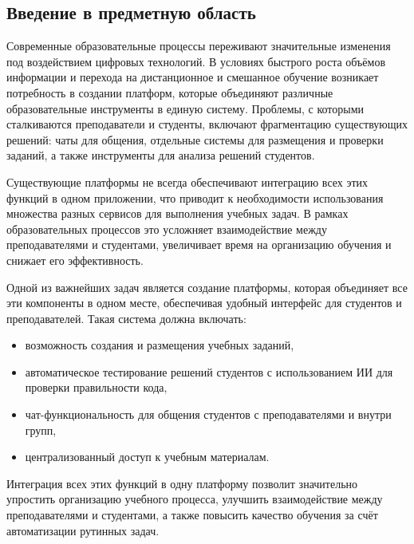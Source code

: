 \subsection{Введение в предметную область}

Современные образовательные процессы переживают значительные изменения под воздействием цифровых технологий. В условиях быстрого роста объёмов информации и перехода на дистанционное и смешанное обучение возникает потребность в создании платформ, которые объединяют различные образовательные инструменты в единую систему. Проблемы, с которыми сталкиваются преподаватели и студенты, включают фрагментацию существующих решений: чаты для общения, отдельные системы для размещения и проверки заданий, а также инструменты для анализа решений студентов.

Существующие платформы не всегда обеспечивают интеграцию всех этих функций в одном приложении, что приводит к необходимости использования множества разных сервисов для выполнения учебных задач. В рамках образовательных процессов это усложняет взаимодействие между преподавателями и студентами, увеличивает время на организацию обучения и снижает его эффективность.

Одной из важнейших задач является создание платформы, которая объединяет все эти компоненты в одном месте, обеспечивая удобный интерфейс для студентов и преподавателей. Такая система должна включать:
\begin{itemize}
  \item возможность создания и размещения учебных заданий,
  \item автоматическое тестирование решений студентов с использованием ИИ для проверки правильности кода,
  \item чат-функциональность для общения студентов с преподавателями и внутри групп,
  \item централизованный доступ к учебным материалам.
\end{itemize}

Интеграция всех этих функций в одну платформу позволит значительно упростить организацию учебного процесса, улучшить взаимодействие между преподавателями и студентами, а также повысить качество обучения за счёт автоматизации рутинных задач.
